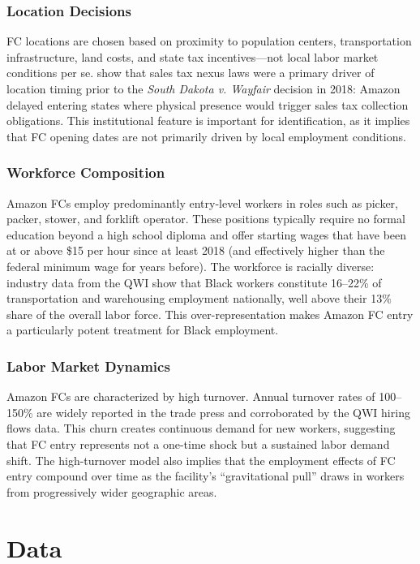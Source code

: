 \documentclass[12pt]{article}
\begin{document}
\subsubsection*{Location Decisions} FC locations are chosen based on proximity to population centers, transportation infrastructure, land costs, and state tax incentives---not local labor market conditions per se. \citet{HoudeNewberrySeim2023} show that sales tax nexus laws were a primary driver of location timing prior to the \textit{South Dakota v. Wayfair} decision in 2018: Amazon delayed entering states where physical presence would trigger sales tax collection obligations. This institutional feature is important for identification, as it implies that FC opening dates are not primarily driven by local employment conditions.

\subsubsection*{Workforce Composition} Amazon FCs employ predominantly entry-level workers in roles such as picker, packer, stower, and forklift operator. These positions typically require no formal education beyond a high school diploma and offer starting wages that have been at or above \$15 per hour since at least 2018 (and effectively higher than the federal minimum wage for years before). The workforce is racially diverse: industry data from the QWI show that Black workers constitute 16--22\% of transportation and warehousing employment nationally, well above their 13\% share of the overall labor force. This over-representation makes Amazon FC entry a particularly potent treatment for Black employment.

\subsubsection*{Labor Market Dynamics} Amazon FCs are characterized by high turnover. Annual turnover rates of 100--150\% are widely reported in the trade press and corroborated by the QWI hiring flows data. This churn creates continuous demand for new workers, suggesting that FC entry represents not a one-time shock but a sustained labor demand shift. The high-turnover model also implies that the employment effects of FC entry compound over time as the facility's ``gravitational pull'' draws in workers from progressively wider geographic areas.


\section{Data}
\end{document}
